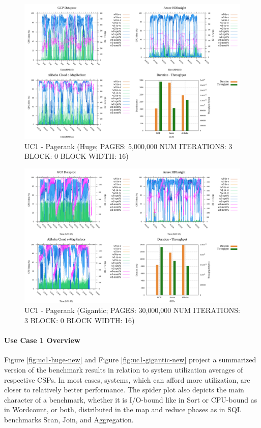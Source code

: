 \documentclass[review]{elsarticle}
\begin{document}
\begin{figure}[p]
	\caption{UC1 - Pagerank (Huge; PAGES: 5,000,000 NUM ITERATIONS: 3 BLOCK: 0 BLOCK WIDTH: 16)}
	\label{fig:uc1-page-h-cmidt}
	\includegraphics[width=\textwidth]{uc1-page-h-cmidt}
	\centering
\end{figure}

\begin{figure}[p]
	\caption{UC1 - Pagerank (Gigantic; PAGES: 30,000,000 NUM ITERATIONS: 3 BLOCK: 0 BLOCK WIDTH: 16)}
	\label{fig:uc1-page-g-cmidt}
	\includegraphics[width=\textwidth]{uc1-page-g-cmidt}
	\centering
\end{figure}


\paragraph{Use Case 1 Overview}Figure \ref{fig:uc1-huge-new} and Figure  \ref{fig:uc1-gigantic-new} project a summarized version of the benchmark results in relation to system utilization averages of respective CSPs. In most cases, systems, which can afford more utilization, are closer to relatively better performance. The spider plot also depicts the main character of a benchmark, whether it is I/O-bound like in Sort or CPU-bound as in Wordcount, or both, distributed in the map and reduce phases as in SQL benchmarks Scan, Join, and Aggregation. 
\end{document}
